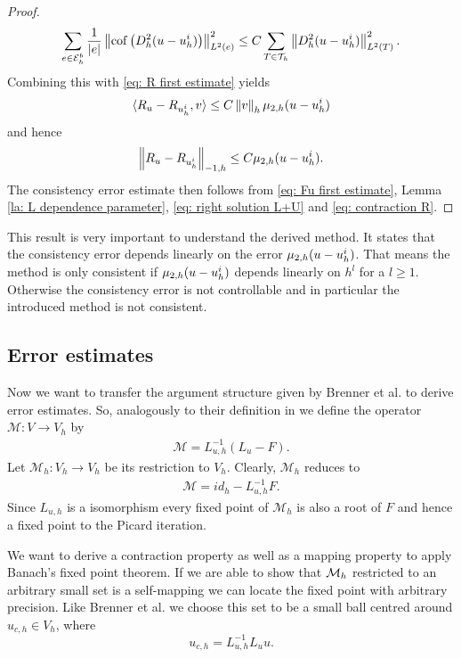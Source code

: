 \begin{proof}
	\begin{align}
	\sum_{e \in \mathcal{E}_h^b} \frac 1 {|e|} \left\lVert  \operatorname{cof} \left( D_h^2 (u-u_h^i) \right) \right\rVert_{L^2(e)}^2 
	\leq C \sum_{T \in \mathcal{T}_h} \left\lVert D_h^2 (u-u_h^i) \right\rVert_{L^2(T)}^2.
	\end{align}
	Combining this with \eqref{eq: R first estimate} yields
	\begin{align*}
	 \langle R_u - R_{u^i_h}, v \rangle \leq C \left\lVert v \right\rVert_{h} \mu_{2,h}(u-u_h^i)
	\end{align*}
	and hence 
	\begin{align}
	\left\lVert R_u - R_{u^i_h} \right\rVert_{-1,h} \leq C \mu_{2,h}(u-u_h^i). \label{eq: contraction R}
	\end{align}
	The consistency error estimate then follows from \eqref{eq: Fu first estimate}, Lemma \ref{la: L dependence parameter}, \eqref{eq: right solution L+U} and \eqref{eq: contraction R}.
\end{proof}

This result is very important to understand the derived method. It states that the consistency error depends linearly on the error $\mu_{2,h}(u-u^i_h)$. That means the method is only consistent if $\mu_{2,h}(u-u^i_h)$ depends linearly on $h^l$ for a $l \geq 1$. Otherwise the consistency error is not controllable and in particular the introduced method is not consistent.

\subsection{Error estimates}
Now we want to transfer the argument structure given by Brenner et al. to derive error estimates. So, analogously to their definition in \cite[(3.1)]{BGN+2011} we define the operator $\mathcal M: V \rightarrow V_h$ by
\begin{align}
	\mathcal M = L_{u,h}^{-1}(L_{u} - F).
\end{align}
Let $\mathcal M_h:V_h \rightarrow V_h$ be its restriction to $V_h$. Clearly, $\mathcal M_h$ reduces to 
\begin{align}
\mathcal M = id_h - L_{u,h}^{-1}F.
\end{align}
Since $L_{u,h}$ is a isomorphism every fixed point of $\mathcal M_h$ is also a root of $F$ and hence a fixed point to the Picard iteration.

We want to derive a contraction property as well as a mapping property to apply Banach's fixed point theorem. If we are able to show that $\mathcal M_h$ restricted to an arbitrary small set is a self-mapping we can locate the fixed point with arbitrary precision. Like Brenner et al. \cite[(3.3)]{BGN+2011} we choose this set to be a small ball centred around $u_{c,h}\in V_h$, where
\[
u_{c,h} = L_{u,h}^{-1} L_u u.
\]

